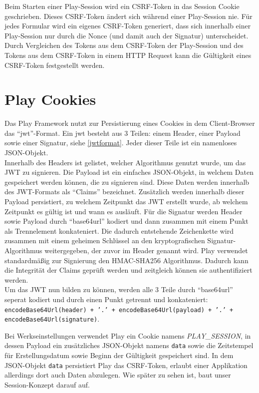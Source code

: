\documentclass[12pt,DIV14,BCOR10mm,a4paper,parskip=half-,headsepline,headinclude,english,ngerman,bibliography=totocnumbered]{scrreprt}
\begin{document}
Beim Starten einer Play-Session wird ein CSRF-Token in das Session Cookie geschrieben. Dieses CSRF-Token ändert sich während einer Play-Session nie. Für jedes Formular wird ein eigenes CSRF-Token generiert, dass sich innerhalb einer Play-Session nur durch die Nonce (und damit auch der Signatur) unterscheidet. Durch Vergleichen des Tokens aus dem CSRF-Token der Play-Session und des Tokens aus dem CSRF-Token in einem HTTP Request kann die Gültigkeit eines CSRF-Token festgestellt werden.


\section{Play Cookies}
\label{play:cookies}
Das Play Framework nutzt zur Persistierung eines Cookies in dem Client-Browser das \enquote{\gls{jwt}}-Format.
Ein \gls{jwt} besteht aus 3 Teilen: einem Header, einer Payload sowie einer Signatur, siehe \ref{jwtformat}.
Jeder dieser Teile ist ein namenloses JSON-Objekt. \\
Innerhalb des Headers ist gelistet, welcher Algorithmus genutzt wurde, um das JWT zu signieren.
Die Payload ist ein einfaches JSON-Objekt, in welchem Daten gespeichert werden können, die zu signieren sind.
Diese Daten werden innerhalb des JWT-Formats als \enquote{Claims} bezeichnet.
Zusätzlich werden innerhalb dieser Payload persistiert, zu welchem Zeitpunkt das JWT erstellt wurde, ab welchem Zeitpunkt es gültig ist und wann es ausläuft.
Für die Signatur werden Header sowie Payload durch \enquote{base64url} kodiert und dann zusammen mit einem Punkt als Trennelement konkateniert. Die dadurch entstehende Zeichenkette wird zusammen mit einem geheimen Schlüssel an den kryptografischen Signatur-Algorithmus weitergegeben, der zuvor im Header genannt wird.
Play verwendet standardmäßig zur Signierung den HMAC-SHA256 Algorithmus.
Dadurch kann die Integrität der Claims geprüft werden und zeitgleich können sie authentifiziert werden. \\
Um das JWT nun bilden zu können, werden alle 3 Teile durch \enquote{base64url} seperat kodiert und durch einen Punkt getrennt und konkateniert: \texttt{encodeBase64Url(header) + '.' + encodeBase64Url(payload) + '.' + encodeBase64Url(signature)}.
\par
Bei Werkseinstellungen verwendet Play ein Cookie namens \textit{PLAY\_SESSION}, in dessen Payload ein zusätzliches JSON-Objekt namens \texttt{data} sowie die Zeitstempel für Erstellungsdatum sowie Beginn der Gültigkeit gespeichert sind.
In dem JSON-Objekt \texttt{data} persistiert Play das CSRF-Token, erlaubt einer Applikation allerdings dort auch Daten abzulegen.
Wie später zu sehen ist, baut unser Session-Konzept darauf auf.
\end{document}
